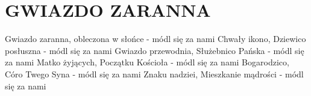 \documentclass[../../../songbook.tex]{subfiles}
\begin{document}
\TabPositions{8cm} %
\section*{GWIAZDO ZARANNA}
{}
\vspace{0.5cm}
Gwiazdo zaranna, obleczona w słońce		 \newline
\-\hspace{1cm} - módl się za nami		 \newline
Chwały ikono, Dziewico posłuszna \newline
\-\hspace{1cm} - módl się za nami \newline
Gwiazdo przewodnia, Służebnico Pańska	 \newline
\-\hspace{1cm} - módl się za nami		 \newline
Matko żyjących, Początku Kościoła  \newline
\-\hspace{1cm} - módl się za nami \newline
Bogarodzico, Córo Twego Syna			 \newline
\-\hspace{1cm} - módl się za nami		 \newline
Znaku nadziei, Mieszkanie mądrości  \newline
\-\hspace{1cm} - módl się za nami \newline
\end{document}
